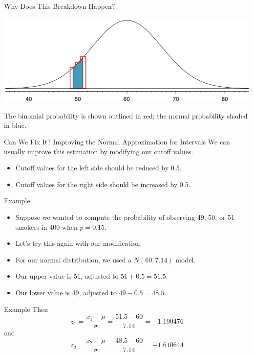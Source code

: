 \begin{frame}{Why Does This Breakdown Happen?}
    \begin{center}
        \includegraphics[scale=0.4]{images/approxbreak.png}
    \end{center}
    The binomial probability is shown outlined in red; the normal probability shaded in blue. 
\end{frame}

\begin{frame}{Can We Fix It? Improving the Normal Approximation for Intervals}
    We can usually improve this estimation by modifying our cutoff values.
    \begin{itemize}
        \item Cutoff values for the left side should be reduced by 0.5.
        \item Cutoff values for the right side should be increased by 0.5.
    \end{itemize}
\end{frame}

\begin{frame}{Example}
    \begin{itemize}
        \item Suppose we wanted to compute the probability of observing 49, 50, or 51 smokers in 400 when $p = 0.15$.
        \item Let's try this again with our modification.
        \item For our normal distribution, we used a $N(60, 7.14)$ model.
        \item Our upper value is 51, adjusted to $51+0.5=51.5$.
        \item Our lower value is 49, adjusted to $49-0.5=48.5$.
    \end{itemize}
\end{frame}

\begin{frame}{Example}
    Then
    \[
    z_1 = \frac{x_1 - \mu}{\sigma} = \frac{51.5-60}{7.14} = -1.190476
    \]
    and 
    \[
    z_2 = \frac{x_2 - \mu}{\sigma} = \frac{48.5-60}{7.14} = -1.610644
    \]
\end{frame}

